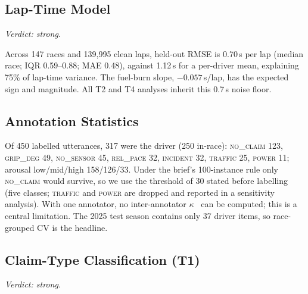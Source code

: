 \subsection{Lap-Time Model}
\emph{Verdict: strong.}

Across 147 races and 139{,}995 clean laps, held-out RMSE is 0.70\,s per lap (median race; IQR 0.59--0.88; MAE 0.48), against 1.12\,s for a per-driver mean, explaining 75\% of lap-time variance. The fuel-burn slope, $-0.057$\,s/lap, has the expected sign and magnitude. All T2 and T4 analyses inherit this 0.7\,s noise floor.

\subsection{Annotation Statistics}
Of 450 labelled utterances, 317 were the driver (250 in-race): \textsc{no\_claim} 123, \textsc{grip\_deg} 49, \textsc{no\_sensor} 45, \textsc{rel\_pace} 32, \textsc{incident} 32, \textsc{traffic} 25, \textsc{power} 11; arousal low/mid/high 158/126/33. Under the brief's 100-instance rule only \textsc{no\_claim} would survive, so we use the threshold of 30 stated before labelling (five classes; \textsc{traffic} and \textsc{power} are dropped and reported in a sensitivity analysis). With one annotator, no inter-annotator $\kappa$~\cite{cohen1960kappa} can be computed; this is a central limitation. The 2025 test season contains only 37 driver items, so race-grouped CV is the headline.

\subsection{Claim-Type Classification (T1)}
\emph{Verdict: strong.}

